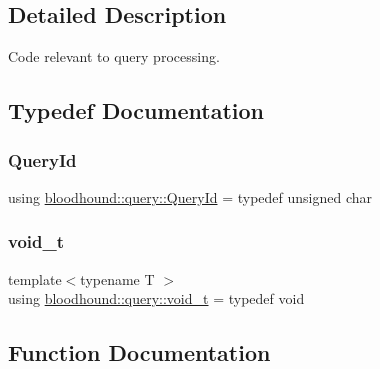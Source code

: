 \subsection{Detailed Description}
Code relevant to query processing. 

\subsection{Typedef Documentation}
\mbox{\label{namespacebloodhound_1_1query_aa67214af106292b2483995adea986b08}} 
\subsubsection{\texorpdfstring{Query\+Id}{QueryId}}
{\footnotesize\ttfamily using \hyperlink{namespacebloodhound_1_1query_aa67214af106292b2483995adea986b08}{bloodhound\+::query\+::\+Query\+Id} = typedef unsigned char}

\mbox{\label{namespacebloodhound_1_1query_afd658a38b784a8187f8782905cb901e6}} 
\subsubsection{\texorpdfstring{void\+\_\+t}{void\_t}}
{\footnotesize\ttfamily template$<$typename T $>$ \\
using \hyperlink{namespacebloodhound_1_1query_afd658a38b784a8187f8782905cb901e6}{bloodhound\+::query\+::void\+\_\+t} = typedef void}



\subsection{Function Documentation}
\mbox{\label{namespacebloodhound_1_1query_a1ec90cdc5f56c17431fd2e2cd2acbb93}} 
